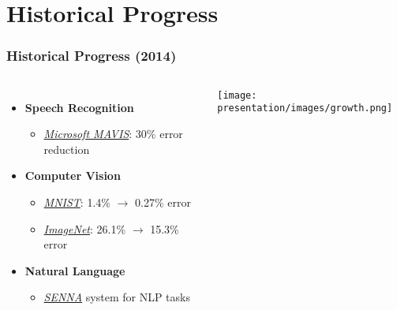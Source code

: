 \documentclass{beamer}
\begin{document}
\section{Historical Progress}

\begin{frame}[fragile]
\frametitle{Historical Progress (2014)}
\begin{columns}
    \begin{itemize}
    \item \textbf{Speech Recognition}
        \begin{itemize}
        \item \href{https://www.microsoft.com/en-us/research/project/mavis/}{\textit{Microsoft MAVIS}}: 30\% error reduction
        \end{itemize}
    \item \textbf{Computer Vision}
        \begin{itemize}
        \item \href{https://yann.lecun.com/exdb/mnist/}{\textit{MNIST}}: 1.4\% $\rightarrow$ 0.27\% error
        \item \href{https://en.wikipedia.org/wiki/ImageNet}{\textit{ImageNet}}: 26.1\% $\rightarrow$ 15.3\% error
        \end{itemize}
    \item \textbf{Natural Language}
        \begin{itemize}
        \item \href{https://ronan.collobert.com/senna/}{\textit{SENNA}} system for NLP tasks
        \end{itemize}
    \end{itemize}
    \pause
    
    \texttt{[image: presentation/images/growth.png]}
\end{columns}
\end{frame}
\end{document}
